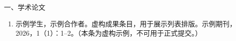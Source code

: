 \begin{publication}
\noindent 一、学术论文
\begin{enumerate}
  \item 示例学生，示例合作者。虚构成果条目，用于展示列表排版。示例期刊，2026，1（1）：1--2。（本条为虚构示例，不可用于正式提交。）
\end{enumerate}
\end{publication}
